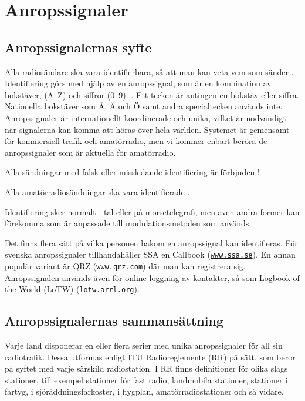 \section{Anropssignaler}

\subsection{Anropssignalernas syfte}

Alla radiosändare ska vara identifierbara, så att man kan veta vem
som sänder \cite[\S19.1]{ITU-RR}.
Identifiering görs med hjälp av en anropssignal, som är en kombination av
bokstäver, (A--Z) och siffror (0--9). \cite[\S19.45]{ITU-RR}.
Ett tecken är antingen en bokstav eller siffra.
Nationella bokstäver som Å, Ä och Ö samt andra specialtecken används inte.
Anropssignaler är internationellt koordinerade och unika, vilket är nödvändigt
när signalerna kan komma att höras över hela världen.
Systemet är gemensamt för kommersiell trafik och amatörradio, men vi kommer
enbart beröra de anropssignaler som är aktuella för amatörradio.

Alla sändningar med falsk eller missledande identifiering är förbjuden
\cite[\S19.2]{ITU-RR}!

Alla amatörradiosändningar ska vara identifierade \cite[\S19.4, \S19.5]{ITU-RR}.

Identifiering sker normalt i tal eller på morsetelegrafi, men även andra former
kan förekomma som är anpassade till modulationsmetoden som används.

Det finns flera sätt på vilka personen bakom en anropssignal kan identifieras.
För svenska anropssignaler tillhandahåller SSA en Callbook
(\href{http://www.ssa.se/}{\texttt{www.ssa.se}}).
En annan populär variant är QRZ (\href{https://www.qrz.com/}{\texttt{www.qrz.com}}) där
man kan registrera sig.
Anropssignalen används även för online-loggning av kontakter, så som
Logbook of the World (LoTW) (\href{https://lotw.arrl.org/}{\texttt{lotw.arrl.org}}).

\subsection{Anropssignalernas sammansättning}

Varje land disponerar en eller flera serier med unika anropssignaler för all
sin radiotrafik.
Dessa utformas enligt ITU Radioreglemente (RR) \cite[\S19]{ITU-RR} på sätt,
som beror på syftet med varje särskild radiostation.
I RR finns definitioner för olika slags stationer, till exempel stationer för fast
radio, landmobila stationer, stationer i fartyg, i sjöräddningsfarkoster,
i flygplan, amatörradiostationer och så vidare.

